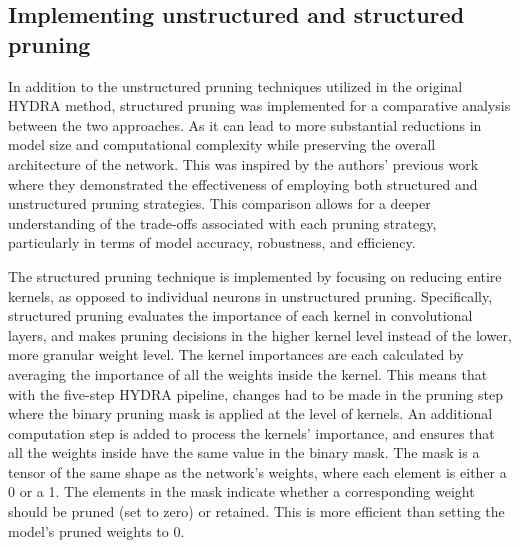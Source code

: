 \documentclass[journal,onecolumn,12pt]{IEEEtran}
\begin{document}
\subsection{Implementing unstructured and structured pruning}
In addition to the unstructured pruning techniques utilized in the original HYDRA method, structured pruning was implemented for a comparative analysis between the two approaches. As it can lead to more substantial reductions in model size and computational complexity while preserving the overall architecture of the network. This was inspired by the authors' previous work where they demonstrated the effectiveness of employing both structured and unstructured pruning strategies. This comparison allows for a deeper understanding of the trade-offs associated with each pruning strategy, particularly in terms of model accuracy, robustness, and efficiency.

The structured pruning technique is implemented by focusing on reducing entire kernels, as opposed to individual neurons in unstructured pruning. Specifically, structured pruning evaluates the importance of each kernel in convolutional layers, and makes pruning decisions in the higher kernel level instead of the lower, more granular weight level. The kernel importances are each calculated by averaging the importance of all the weights inside the kernel. This means that with the five-step HYDRA pipeline, changes had to be made in the pruning step where the binary pruning mask is applied at the level of kernels. An additional computation step is added to process the kernels' importance, and ensures that all the weights inside have the same value in the binary mask. The mask is a tensor of the same shape as the network's weights, where each element is either a 0 or a 1. The elements in the mask indicate whether a corresponding weight should be pruned (set to zero) or retained. This is more efficient than setting the model's pruned weights to 0.
\end{document}
